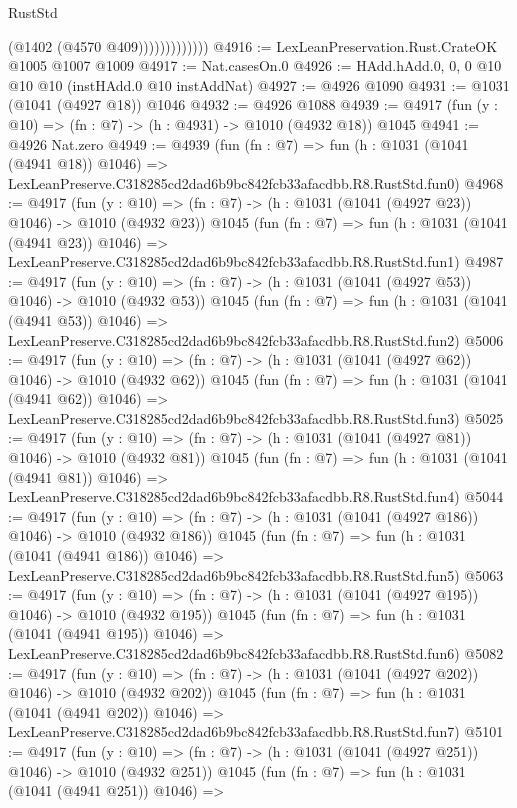\begin{lexlean}{RustStd}
\begin{coremodule}
                          (@1402 (@4570 @409)))))))))))))
@4916 := LexLeanPreservation.Rust.CrateOK @1005 @1007 @1009
@4917 := Nat.casesOn.{0}
@4926 := HAdd.hAdd.{0, 0, 0} @10 @10 @10 (instHAdd.{0} @10 instAddNat)
@4927 := @4926 @1090
@4931 := @1031 (@1041 (@4927 @18)) @1046
@4932 := @4926 @1088
@4939 := @4917 (fun (y : @10) => (fn : @7) -> (h : @4931) -> @1010 (@4932 @18)) @1045
@4941 := @4926 Nat.zero
@4949 := @4939
    (fun (fn : @7) =>
    fun (h : @1031 (@1041 (@4941 @18)) @1046) =>
    LexLeanPreserve.C318285cd2dad6b9bc842fcb33afacdbb.R8.RustStd.fun0)
@4968 := @4917
    (fun (y : @10) => (fn : @7) -> (h : @1031 (@1041 (@4927 @23)) @1046) -> @1010 (@4932 @23))
    @1045
    (fun (fn : @7) =>
    fun (h : @1031 (@1041 (@4941 @23)) @1046) =>
    LexLeanPreserve.C318285cd2dad6b9bc842fcb33afacdbb.R8.RustStd.fun1)
@4987 := @4917
    (fun (y : @10) => (fn : @7) -> (h : @1031 (@1041 (@4927 @53)) @1046) -> @1010 (@4932 @53))
    @1045
    (fun (fn : @7) =>
    fun (h : @1031 (@1041 (@4941 @53)) @1046) =>
    LexLeanPreserve.C318285cd2dad6b9bc842fcb33afacdbb.R8.RustStd.fun2)
@5006 := @4917
    (fun (y : @10) => (fn : @7) -> (h : @1031 (@1041 (@4927 @62)) @1046) -> @1010 (@4932 @62))
    @1045
    (fun (fn : @7) =>
    fun (h : @1031 (@1041 (@4941 @62)) @1046) =>
    LexLeanPreserve.C318285cd2dad6b9bc842fcb33afacdbb.R8.RustStd.fun3)
@5025 := @4917
    (fun (y : @10) => (fn : @7) -> (h : @1031 (@1041 (@4927 @81)) @1046) -> @1010 (@4932 @81))
    @1045
    (fun (fn : @7) =>
    fun (h : @1031 (@1041 (@4941 @81)) @1046) =>
    LexLeanPreserve.C318285cd2dad6b9bc842fcb33afacdbb.R8.RustStd.fun4)
@5044 := @4917
    (fun (y : @10) => (fn : @7) -> (h : @1031 (@1041 (@4927 @186)) @1046) -> @1010 (@4932 @186))
    @1045
    (fun (fn : @7) =>
    fun (h : @1031 (@1041 (@4941 @186)) @1046) =>
    LexLeanPreserve.C318285cd2dad6b9bc842fcb33afacdbb.R8.RustStd.fun5)
@5063 := @4917
    (fun (y : @10) => (fn : @7) -> (h : @1031 (@1041 (@4927 @195)) @1046) -> @1010 (@4932 @195))
    @1045
    (fun (fn : @7) =>
    fun (h : @1031 (@1041 (@4941 @195)) @1046) =>
    LexLeanPreserve.C318285cd2dad6b9bc842fcb33afacdbb.R8.RustStd.fun6)
@5082 := @4917
    (fun (y : @10) => (fn : @7) -> (h : @1031 (@1041 (@4927 @202)) @1046) -> @1010 (@4932 @202))
    @1045
    (fun (fn : @7) =>
    fun (h : @1031 (@1041 (@4941 @202)) @1046) =>
    LexLeanPreserve.C318285cd2dad6b9bc842fcb33afacdbb.R8.RustStd.fun7)
@5101 := @4917
    (fun (y : @10) => (fn : @7) -> (h : @1031 (@1041 (@4927 @251)) @1046) -> @1010 (@4932 @251))
    @1045
    (fun (fn : @7) =>
    fun (h : @1031 (@1041 (@4941 @251)) @1046) =>

\end{coremodule}
\end{lexlean}

